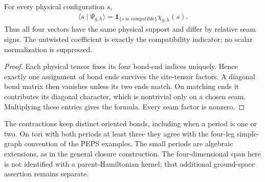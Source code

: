 \begin{lemma}
    \label{thm:toric_code_torus_amplitudes}
    \leanok
    For every physical configuration $s$,
    \begin{align}
        \langle s\mid\Psi_{g,h}\rangle
        =\mathbf1_{\{s\text{ is compatible}\}}\chi_{g,h}(s).
    \end{align}
    Thus all four vectors have the same physical support and differ by
    relative seam signs. The untwisted coefficient is exactly the
    compatibility indicator; no scalar normalization is suppressed.
\end{lemma}
\begin{proof}\leanok
    Each physical tensor fixes its four bond-end indices uniquely.
    Hence exactly one assignment of bond ends survives the site-tensor
    factors. A diagonal bond matrix then vanishes unless its two ends
    match. On matching ends it contributes its diagonal character, which
    is nontrivial only on a chosen seam. Multiplying these entries gives
    the formula. Every seam factor is nonzero.
\end{proof}

The contractions keep distinct oriented bonds, including when a period
is one or two. On tori with both periods at least three they agree with
the four-leg simple-graph convention of the PEPS examples. The small
periods are algebraic extensions, as in the general closure construction.
The four-dimensional span here is not identified with a parent-Hamiltonian
kernel; that additional ground-space assertion remains separate.
